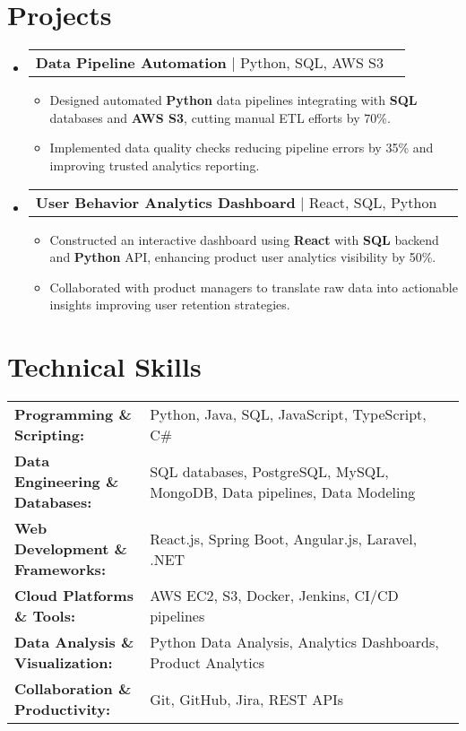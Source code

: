 \documentclass[letterpaper,11pt]{article}
\makeatletter
\newcommand{\resumeItem}[1]{
  \item\footnotesize{
    {#1 \vspace{-2pt}}
  }
}
\newcommand{\resumeProjectHeading}[2]{
    \item
    \begin{tabular*}{1.001\textwidth}{l@{\extracolsep{\fill}}r}
      \small#1 & \textbf{\small #2}\\
    \end{tabular*}\vspace{-7pt}
}
\newcommand{\resumeSubHeadingListStart}{\begin{itemize}[leftmargin=0pt, label={}]}
\newcommand{\resumeSubHeadingListEnd}{\end{itemize}}
\newcommand{\resumeItemListStart}{\begin{itemize}[leftmargin=*]}
\newcommand{\resumeItemListEnd}{\end{itemize}\vspace{-5pt}}
\makeatother
\begin{document}
\section{Projects}
    \vspace{-5pt}
    \resumeSubHeadingListStart
      \resumeProjectHeading
          {\textbf{Data Pipeline Automation} | Python, SQL, AWS S3}
          {}
          \resumeItemListStart
              \resumeItem{Designed automated \textbf{Python} data pipelines integrating with \textbf{SQL} databases and \textbf{AWS S3}, cutting manual ETL efforts by 70\%.}
              \resumeItem{Implemented data quality checks reducing pipeline errors by 35\% and improving trusted analytics reporting.}
          \resumeItemListEnd
          \vspace{-16pt}
      \resumeProjectHeading
          {\textbf{User Behavior Analytics Dashboard} | React, SQL, Python}
          {}
          \resumeItemListStart
              \resumeItem{Constructed an interactive dashboard using \textbf{React} with \textbf{SQL} backend and \textbf{Python} API, enhancing product user analytics visibility by 50\%.}
              \resumeItem{Collaborated with product managers to translate raw data into actionable insights improving user retention strategies.}
          \resumeItemListEnd 
    \resumeSubHeadingListEnd
\vspace{-10pt}
\section{Technical Skills}
        \vspace{-14pt}
        \begin{table}[h]
            \footnotesize
            \begin{tabular}{p{0.3\linewidth} p{0.7\linewidth}}
                \textbf{Programming \& Scripting:} & Python, Java, SQL, JavaScript, TypeScript, C\# \\
                \textbf{Data Engineering \& Databases:} & SQL databases, PostgreSQL, MySQL, MongoDB, Data pipelines, Data Modeling \\
                \textbf{Web Development \& Frameworks:} & React.js, Spring Boot, Angular.js, Laravel, .NET \\
                \textbf{Cloud Platforms \& Tools:} & AWS EC2, S3, Docker, Jenkins, CI/CD pipelines \\
                \textbf{Data Analysis \& Visualization:} & Python Data Analysis, Analytics Dashboards, Product Analytics \\
                \textbf{Collaboration \& Productivity:} & Git, GitHub, Jira, REST APIs \\
            \end{tabular}
        \end{table}
\end{document}
